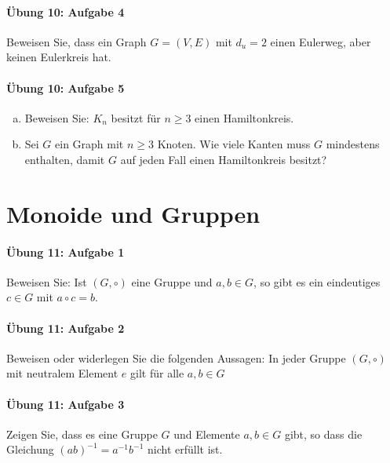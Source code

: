 \documentclass
[
  draft    = true,
  fontsize = 11pt,
  parskip  = half-,
  BCOR     = 0pt,
  DIV      = 11,
  ngerman,
  dvipsnames
]
{scrartcl}
\begin{document}
\paragraph{Übung 10: Aufgabe 4}
Beweisen Sie, dass ein Graph $G=(V,E)$ mit $d_u=2$ einen Eulerweg, aber
keinen Eulerkreis hat.

\paragraph{Übung 10: Aufgabe 5}
\begin{enumerate}[a)]
  \item Beweisen Sie: $K_n$ besitzt für $n\geq3$ einen Hamiltonkreis.
  \item Sei $G$ ein Graph mit $n\geq3$ Knoten. Wie viele Kanten muss $G$
        mindestens enthalten, damit $G$ auf jeden Fall einen Hamiltonkreis
        besitzt?
\end{enumerate}

\section{Monoide und Gruppen}

\paragraph{Übung 11: Aufgabe 1}
Beweisen Sie: Ist $(G,\circ)$ eine Gruppe und $a,b\in G$, so gibt es ein
eindeutiges $c\in G$ mit $a\circ c=b$.

\paragraph{Übung 11: Aufgabe 2}
Beweisen oder widerlegen Sie die folgenden Aussagen: In jeder Gruppe
$(G,\circ)$ mit neutralem Element $e$ gilt für alle $a,b\in G$

\paragraph{Übung 11: Aufgabe 3}
Zeigen Sie, dass es eine Gruppe $G$ und Elemente $a,b\in G$ gibt, so
dass die Gleichung $(ab)^{-1}=a^{-1}b^{-1}$ nicht erfüllt ist.
\end{document}
